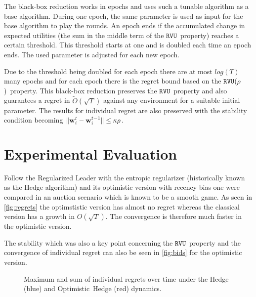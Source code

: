 \documentclass[a4paper]{article}
\theoremstyle{definition}
\newcommand{\myprop}{\ensuremath{\texttt{RVU}}}
\newcommand{\mst}{\ensuremath{w}}
\newcommand{\stable}{\ensuremath{\kappa}}
\newcommand{\knob}{\ensuremath{\rho}}
\renewcommand{\vec}[1]{\ensuremath{{\bf #1}}}
\begin{document}
The black-box reduction works in epochs and uses such a tunable
algorithm as a base algorithm.
During one epoch, the same parameter is used as input for the base
algorithm to play the rounds.
An epoch ends if the accumulated change in expected utilities (the sum in the
middle term of the \myprop~property) reaches a certain threshold.
This threshold starts at one and is doubled each time an epoch ends.
The used parameter is adjusted for each new epoch.

Due to the threshold being doubled for each epoch there are at most $log(T)$ many epochs and for
each epoch there is the regret bound based on the
\myprop(\knob)~property.
This black-box reduction preserves the \myprop~property and also
guarantees a regret in $\tilde{O}(\sqrt{T})$ against any environment for a
suitable initial parameter.
The results for individual regret are also preserved with the stability
condition becoming $\|\vec{\mst}_i^t-\vec{\mst}_i^{t-1}\| \leq \stable\knob$.



\section{Experimental Evaluation}

Follow the Regularized Leader with the entropic regularizer
(historically known as the Hedge algorithm) and its optimistic version
with recency bias one were compared in an auction scenario which is
known to be a smooth game.
As seen in \autoref{fig:regrets} the optimstistic version has almost no regret
whereas the classical version has a growth in $O(\sqrt{T})$.
The convergence is therefore much faster in the optimistic version.

The stability which was also a key point concerning the
\myprop~property and the convergence of individual regret can also be
seen in \autoref{fig:bids} for the optimistic version.

\begin{figure}[p]
\centering
{}
\quad
{}
\caption{Maximum and sum of individual regrets over time under the
  Hedge (blue) and \mbox{Optimistic Hedge} (red) dynamics.}\label{fig:regrets}
\end{figure}
\end{document}
